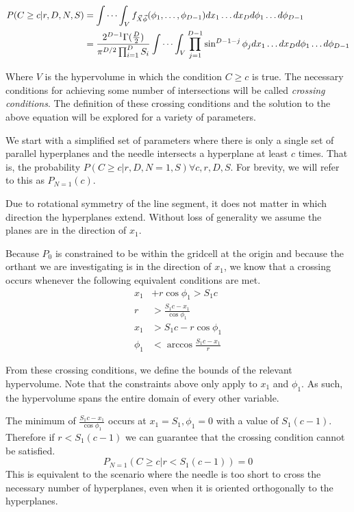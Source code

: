 \documentclass{article}
\begin{document}
\begin{align} 
	P(C\ge c|r, D, N, S)&=\idotsint_V f_{\vec{X}\vec\phi}(\phi_1,\hdots,\phi_{D-1})dx_1 \hdots dx_D d\phi_1 \hdots d\phi_{D-1}\\
	&= \frac{2^{D-1}\Gamma(\frac{D}{2})}{\pi^{D/2}\prod_{i=1}^DS_i} \idotsint_V \prod_{j=1}^{D-1}\sin^{D-1-j}\phi_j dx_1\hdots dx_D d\phi_1 \hdots d\phi_{D-1} \label{eq:volume integral}
\end{align}

Where $V$ is the hypervolume in which the condition $C\ge c$ is true. The necessary conditions for achieving some number of intersections
will be called \emph{crossing conditions}. The definition of these crossing conditions and the solution to the above equation will be
explored for a variety of parameters.

We start with a simplified set of parameters where there is only a single set of parallel hyperplanes and the needle intersects a
hyperplane at least $c$ times. That is, the probability $P(C\ge c | r, D, N=1, S) \forall c, r, D, S$. For brevity, we will refer to this
as $P_{N=1}(c)$.

Due to rotational symmetry of the line segment, it does not matter in which direction the hyperplanes extend. Without loss of
generality we assume the planes are in the direction of $x_1$.

Because $P_0$ is constrained to be within the gridcell at the origin and because the orthant we are investigating is in the direction
of $x_1$, we know that a crossing occurs whenever the following equivalent conditions are met.
\begin{align}
	x_1 &+ r\cos{\phi_1} > S_1c\\
	r &> \frac{S_1c - x_1}{\cos{\phi_1}} \\
	x_1 &> S_1c - r\cos{\phi_1} \\
	\phi_1 &< \arccos{\frac{S_1c-x_1}{r}}
\end{align}

From these crossing conditions, we define the bounds of the relevant hypervolume. Note that the constraints above only apply to $x_1$ and
$\phi_1$. As such, the hypervolume spans the entire domain of every other variable. 

The minimum of $\frac{S_1c - x_1}{\cos{\phi_1}}$ occurs at $x_1=S_1, \phi_1=0$ with a value of $S_1(c-1)$. Therefore if $r<S_1(c-1)$ we can guarantee that the crossing condition
cannot be satisfied. 
\begin{equation}
	P_{N=1}(C\ge c|r<S_1(c-1)) = 0
\end{equation}
This is equivalent to the scenario where the needle is too short to cross the necessary number of hyperplanes, even when it is oriented
orthogonally to the hyperplanes.
\end{document}
